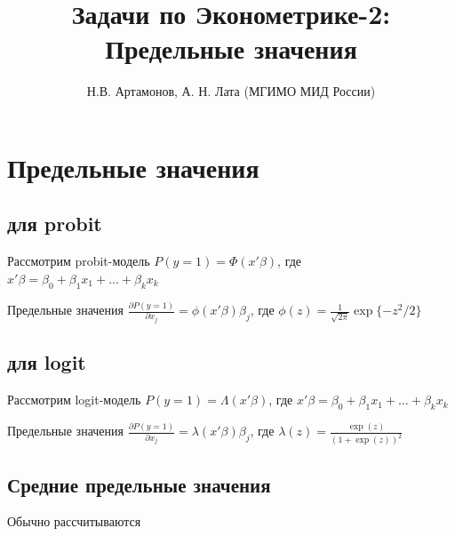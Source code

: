\documentclass[
  russian,
]{article}
\title{Задачи по Эконометрике-2: Предельные значения}
\author{Н.В. Артамонов, А. Н. Лата (МГИМО МИД России)}
\date{}
\renewcommand*\contentsname{Содержание}
\newcommand\contentsname{Содержание}
\begin{document}
\maketitle

\renewcommand*\contentsname{Содержание}
{
\setcounter{tocdepth}{3}
\tableofcontents
}

\section{Предельные
значения}\label{ux43fux440ux435ux434ux435ux43bux44cux43dux44bux435-ux437ux43dux430ux447ux435ux43dux438ux44f}

\subsection{для probit}\label{ux434ux43bux44f-probit}

Рассмотрим probit-модель \(P(y=1)=\Phi(x'\beta)\), где
\(x'\beta=\beta_0+\beta_1x_1+\dots+\beta_kx_k\)

Предельные значения
\(\frac{\partial P(y=1)}{\partial x_j}=\phi(x'\beta)\beta_j\), где
\(\phi(z)=\frac{1}{\sqrt{2\pi}}\exp\{-z^2/2\}\)

\subsection{для logit}\label{ux434ux43bux44f-logit}

Рассмотрим logit-модель \(P(y=1)=\Lambda(x'\beta)\), где
\(x'\beta=\beta_0+\beta_1x_1+\dots+\beta_kx_k\)

Предельные значения
\(\frac{\partial P(y=1)}{\partial x_j}=\lambda(x'\beta)\beta_j\), где
\(\lambda(z)=\frac{\exp(z)}{(1+\exp(z))^2}\)

\subsection{Средние предельные
значения}\label{ux441ux440ux435ux434ux43dux438ux435-ux43fux440ux435ux434ux435ux43bux44cux43dux44bux435-ux437ux43dux430ux447ux435ux43dux438ux44f}

Обычно рассчитываются
\end{document}
